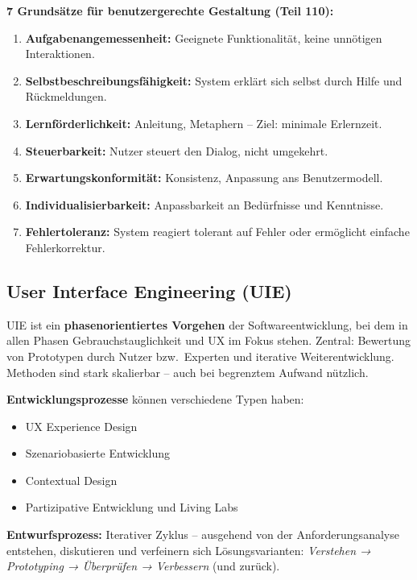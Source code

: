 \documentclass[12pt, a4paper]{article}
\begin{document}
\textbf{7 Grundsätze für benutzergerechte Gestaltung (Teil 110):}
\begin{enumerate}
  \item \textbf{Aufgabenangemessenheit:} Geeignete Funktionalität, keine unnötigen Interaktionen.
  \item \textbf{Selbstbeschreibungsfähigkeit:} System erklärt sich selbst durch Hilfe und Rückmeldungen.
  \item \textbf{Lernförderlichkeit:} Anleitung, Metaphern -- Ziel: minimale Erlernzeit.
  \item \textbf{Steuerbarkeit:} Nutzer steuert den Dialog, nicht umgekehrt.
  \item \textbf{Erwartungskonformität:} Konsistenz, Anpassung ans Benutzermodell.
  \item \textbf{Individualisierbarkeit:} Anpassbarkeit an Bedürfnisse und Kenntnisse.
  \item \textbf{Fehlertoleranz:} System reagiert tolerant auf Fehler oder ermöglicht einfache Fehlerkorrektur.
\end{enumerate}

\subsection{User Interface Engineering (UIE)}

UIE ist ein \textbf{phasenorientiertes Vorgehen} der Softwareentwicklung, bei dem in allen Phasen Gebrauchstauglichkeit und UX im Fokus stehen. Zentral: Bewertung von Prototypen durch Nutzer bzw.\ Experten und iterative Weiterentwicklung. Methoden sind stark skalierbar -- auch bei begrenztem Aufwand nützlich.

\textbf{Entwicklungsprozesse} können verschiedene Typen haben:
\begin{itemize}
  \item UX Experience Design
  \item Szenariobasierte Entwicklung
  \item Contextual Design
  \item Partizipative Entwicklung und Living Labs
\end{itemize}

\textbf{Entwurfsprozess:} Iterativer Zyklus -- ausgehend von der Anforderungsanalyse entstehen, diskutieren und verfeinern sich Lösungsvarianten:
\textit{Verstehen → Prototyping → Überprüfen → Verbessern} (und zurück).
\end{document}
